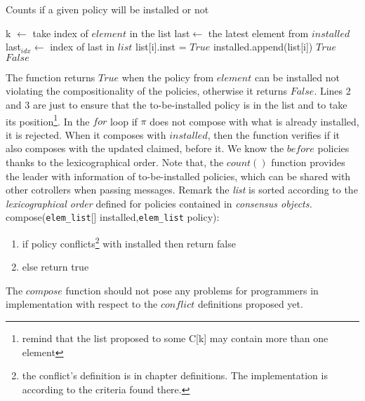 \documentclass{article}
\theoremstyle{remark}
\begin{document}
\begin{algorithm}
\caption{Counts if a given policy will be installed or not}
\begin{algorithmic}[1]
		\State k $\gets$ take index of $element$ in the list
	\EndIf
		\State last$\gets$ the latest element from $installed$
		\State last$_{idx}\gets$ index of last in $list$
				\State list[i].inst = $True$
				\State installed.append(list[i])
			\EndIf	
		\EndFor		
		 \Return $True$
		\EndIf
	\EndIf			
	\State\Return $False$
	\EndProcedure
\end{algorithmic}
\end{algorithm}
The function returns $True$ when the policy from $element$ can be installed not violating the compositionality of the policies, otherwise it returns $False$. Lines 2 and 3 are just to ensure that the to-be-installed policy is in the list and to take its position\footnote{remind that the list proposed to some C[k] may contain more than one element}. In the $for$ loop if $\pi$ does not compose with what is already installed, it is rejected. When it composes with $installed$, then the function verifies if it also composes with the updated claimed, before it. We know the $before$ policies thanks to the lexicographical order. Note that, the $count()$ function provides the leader with information of to-be-installed policies, which can be shared with other cotrollers when passing messages. 
Remark the \emph{list} is sorted according to the \emph{lexicographical order} defined for policies contained in \emph{consensus objects.} \\

compose(\texttt{elem\_list}[] installed,\texttt{elem\_list} policy):
\begin{enumerate}
\item if policy conflicts\footnote{the conflict's definition is in chapter definitions. The implementation is according to the criteria found there.} with installed then return false
\item else return true
\end{enumerate} 
The $compose$ function should not pose any problems for programmers in implementation with respect to the $conflict$ definitions proposed yet.
\end{document}
